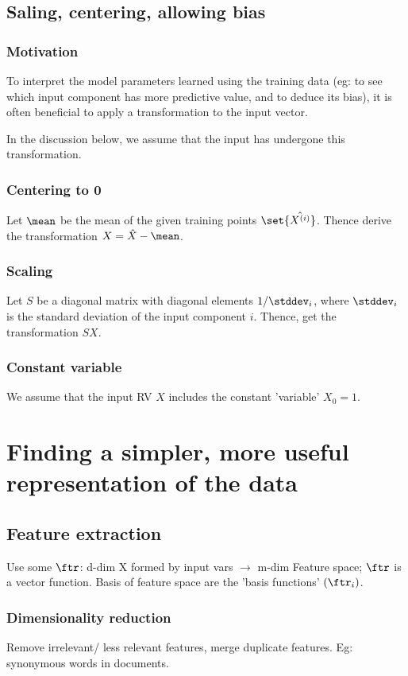 \documentclass[oneside, article]{memoir}
\begin{document}
\section{Saling, centering, allowing bias}
\subsection{Motivation}
To interpret the model parameters learned using the training data (eg: to see which input component has more predictive value, and to deduce its bias), it is often beneficial to apply a transformation to the input vector.

In the discussion below, we assume that the input has undergone this transformation.

\subsection{Centering to 0}
Let $\mean$ be the mean of the given training points $\set{\hat{X^{(i)}}}$. Thence derive the transformation $X = \hat{X} - \mean$.

\subsection{Scaling}
Let $S$ be a diagonal matrix with diagonal elements $1/\stddev_i$, where $\stddev_i$ is the standard deviation of the input component $i$. Thence, get the transformation $SX$. 

\subsection{Constant variable}
We assume that the input RV $X$ includes the constant 'variable' $X_0 = 1$. 

\chapter{Finding a simpler, more useful representation of the data}
\section{Feature extraction}
Use some $\ftr$: d-dim X formed by input vars $\to$ m-dim Feature space; $\ftr$ is a vector function. Basis of feature space are the 'basis functions' $(\ftr_{i})$. \tbc

\subsection{Dimensionality reduction}
Remove irrelevant/ less relevant features, merge duplicate features. Eg: synonymous words in documents.
\end{document}
